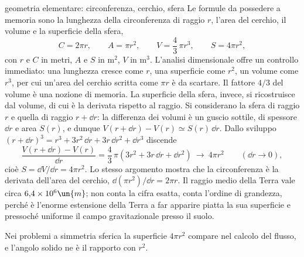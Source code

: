 \documentclass[main.tex]{subfiles}
\begin{document}
\renewcommand{\richiamoprefix}{Richiamo di Matematica --- }
\begin{riquadro}{geometria elementare: circonferenza, cerchio, sfera}
Le formule da possedere a memoria sono la lunghezza della circonferenza di raggio $r$, l'area del cerchio, il volume e la superficie della sfera,
\[
C=2\pi r,\qquad A=\pi r^2,\qquad V=\frac43\,\pi r^3,\qquad S=4\pi r^2 ,
\]
con $r$ e $C$ in metri, $A$ e $S$ in $\mathrm{m^2}$, $V$ in $\mathrm{m^3}$. L'analisi dimensionale offre un controllo immediato: una lunghezza cresce come $r$, una superficie come $r^2$, un volume come $r^3$, per cui un'area del cerchio scritta come $\pi r$ è da scartare. Il fattore $4/3$ del volume è una nozione di memoria. La superficie della sfera, invece, si ricostruisce dal volume, di cui è la derivata rispetto al raggio. Si considerano la sfera di raggio $r$ e quella di raggio $r+\dd r$: la differenza dei volumi è un guscio sottile, di spessore $\dd r$ e area $S(r)$, e dunque $V(r+\dd r)-V(r)\simeq S(r)\,\dd r$. Dallo sviluppo $(r+\dd r)^3=r^3+3r^2\,\dd r+3r\,\dd r^2+\dd r^3$ discende
\[
\frac{V(r+\dd r)-V(r)}{\dd r}=\frac43\,\pi\left(3r^2+3r\,\dd r+\dd r^2\right)\ \longrightarrow\ 4\pi r^2\qquad(\dd r\to0),
\]
cioè $S=\dd V/\dd r=4\pi r^2$. Lo stesso argomento mostra che la circonferenza è la derivata dell'area del cerchio, $\dd(\pi r^2)/\dd r=2\pi r$. Il raggio medio della Terra vale circa $6{,}4\times10^{6}\un{m}$; non conta la cifra esatta, conta l'ordine di grandezza, perché è l'enorme estensione della Terra a far apparire piatta la sua superficie e pressoché uniforme il campo gravitazionale presso il suolo.

Nei problemi a simmetria sferica la superficie $4\pi r^2$ compare nel calcolo del flusso, e l'angolo solido ne è il rapporto con $r^2$.
\end{riquadro}
\end{document}
